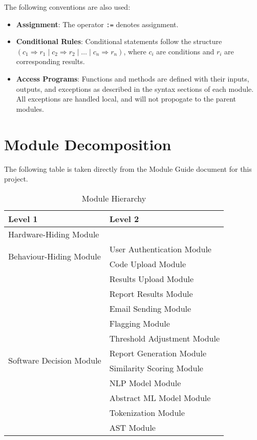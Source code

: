 \documentclass[12pt, titlepage]{article}
\begin{document}
\noindent
The following conventions are also used:
\begin{itemize}
    \item \textbf{Assignment}: The operator \texttt{:=} denotes assignment.
    \item \textbf{Conditional Rules}: Conditional statements follow the structure $(c_1 \Rightarrow r_1 \mid c_2 \Rightarrow r_2 \mid \ldots \mid c_n \Rightarrow r_n)$, where $c_i$ are conditions and $r_i$ are corresponding results.
    \item \textbf{Access Programs}: Functions and methods are defined with their inputs, outputs, and exceptions as described in the syntax sections of each module. All exceptions are handled local, and will not propogate to the parent modules.
\end{itemize}

\section{Module Decomposition}

The following table is taken directly from the Module Guide document for this project.

\begin{table}[h!]
    \centering
    \begin{tabular}{p{} p{}}
    \toprule
    \textbf{Level 1} & \textbf{Level 2} \\
    \midrule
    {Hardware-Hiding Module} & ~ \\
    \midrule
    \multirow{2}{*}{Behaviour-Hiding Module} 
    & User Authentication Module \\
    & Code Upload Module \\
    & Results Upload Module \\
    & Report Results Module \\
    & Email Sending Module \\
    & Flagging Module \\
    & Threshold Adjustment Module \\
    \midrule
    \multirow{2}{*}{Software Decision Module} 
    & Report Generation Module \\
    & Similarity Scoring Module \\
    & NLP Model Module \\
    & Abstract ML Model Module \\
    & Tokenization Module \\
    & AST Module \\
   
    \bottomrule
    \end{tabular}
    \caption{Module Hierarchy}
    \label{TblMH}
  \end{table}
\newpage
~\newpage
\end{document}
